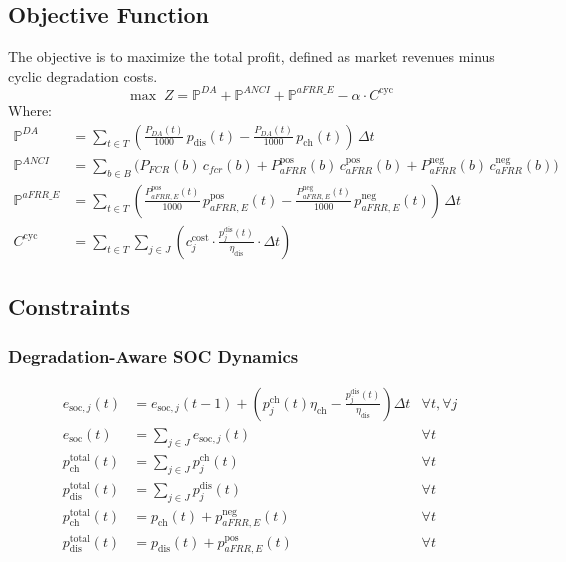 \documentclass[11pt, a4paper]{article}
\begin{document}
\subsection{Objective Function}
The objective is to maximize the total profit, defined as market revenues minus cyclic degradation costs.
\begin{equation}
\max \; Z = \mathbb{P}^{DA} + \mathbb{P}^{ANCI} + \mathbb{P}^{aFRR\_E} - \alpha \cdot C^{\mathrm{cyc}}
\end{equation}
Where:
\begin{align}
\mathbb{P}^{DA} &= \sum_{t\in T} \left( \frac{P_{DA}(t)}{1000}\, p_{\mathrm{dis}}(t) - \frac{P_{DA}(t)}{1000}\, p_{\mathrm{ch}}(t) \right)\, \Delta t \\
\mathbb{P}^{ANCI} &= \sum_{b\in B} \Big( P_{FCR}(b)\, c_{fcr}(b) + P^{\mathrm{pos}}_{aFRR}(b)\, c^{\mathrm{pos}}_{aFRR}(b) + P^{\mathrm{neg}}_{aFRR}(b)\, c^{\mathrm{neg}}_{aFRR}(b) \Big) \\
\mathbb{P}^{aFRR\_E} &= \sum_{t\in T} \left( \frac{P^{\mathrm{pos}}_{aFRR, E}(t)}{1000}\, p^{\mathrm{pos}}_{aFRR, E}(t) - \frac{P^{\mathrm{neg}}_{aFRR, E}(t)}{1000}\, p^{\mathrm{neg}}_{aFRR, E}(t) \right)\, \Delta t \\
C^{\mathrm{cyc}} &= \sum_{t \in T} \sum_{j \in J} \left( c^{\mathrm{cost}}_{j} \cdot \frac{p^{\mathrm{dis}}_{j}(t)}{\eta_{\mathrm{dis}}} \cdot \Delta t \right)
\end{align}

\subsection{Constraints}

\subsubsection{Degradation-Aware SOC Dynamics}
\begin{align}
e_{\mathrm{soc},j}(t) &= e_{\mathrm{soc},j}(t-1) + \left( p^{\mathrm{ch}}_{j}(t) \eta_{\mathrm{ch}} - \frac{p^{\mathrm{dis}}_{j}(t)}{\eta_{\mathrm{dis}}} \right) \Delta t & \forall t, \forall j \\
e_{\mathrm{soc}}(t) &= \sum_{j \in J} e_{\mathrm{soc},j}(t) & \forall t \\
p^{\mathrm{total}}_{\mathrm{ch}}(t) &= \sum_{j \in J} p^{\mathrm{ch}}_{j}(t) & \forall t \\
p^{\mathrm{total}}_{\mathrm{dis}}(t) &= \sum_{j \in J} p^{\mathrm{dis}}_{j}(t) & \forall t \\
p^{\mathrm{total}}_{\mathrm{ch}}(t) &= p_{\mathrm{ch}}(t) + p^{\mathrm{neg}}_{aFRR,E}(t) & \forall t \\
p^{\mathrm{total}}_{\mathrm{dis}}(t) &= p_{\mathrm{dis}}(t) + p^{\mathrm{pos}}_{aFRR,E}(t) & \forall t
\end{align}
\end{document}
